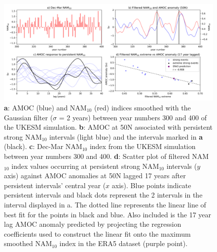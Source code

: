 \begin{figure}[h!]
\begin{center}
\noindent\includegraphics[width =\linewidth]{Figures/Figures-surface/AMOC_response_special_events.png} 
\caption{\textbf{a}: AMOC (blue) and NAM$_{10}$ (red) indices smoothed with the Gaussian filter ($\sigma$ = 2 years) between year numbers 300 and 400 of the UKESM simulation. \textbf{b}: AMOC at 50N associated with persistent strong NAM$_{10}$ intervals (light blue) and the intervals marked in \textbf{a} (black). \textbf{c}: Dec-Mar NAM$_{10}$ index from the UKESM simulation between year numbers 300 and 400. \textbf{d}: Scatter plot of filtered NAM$_{10}$ index values occurring at persistent strong NAM$_{10}$ intervals ($y$ axis) against AMOC anomalies at 50N lagged 17 years after persistent intervals' central year ($x$ axis). Blue points indicate persistent intervals and black dots represent the 2 intervals in the interval displayed in a. The dotted line represents the linear line of best fit for the points in black and blue. Also included is the 17 year lag AMOC anomaly predicted by projecting the regression coefficients used to construct the linear fit onto the maximum smoothed NAM$_{10}$ index in the ERA5 dataset (purple point).}
\label{special_events}
\end{center}
\end{figure}

